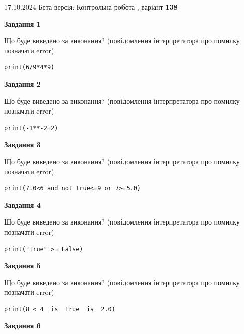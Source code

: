 \documentclass[12pt, ukrainian]{article}
\begin{document}
{\Large{17.10.2024 Бета-версія: Контрольна робота , варіант  \No \textbf { 138 }\par}}
{
\begin {large}
{\begin {center}\textbf{Завдання 1}\end {center}}

Що буде виведено за виконання? (повідомлення інтерпретатора про помилку позначати error)\par
\begin{verbatim}
print(6/9*4*9)
\end{verbatim}

{\begin {center}\textbf{Завдання 2}\end {center}}

Що буде виведено за виконання? (повідомлення інтерпретатора про помилку позначати error)\par
\begin{verbatim}
print(-1**-2+2)
\end{verbatim}

{\begin {center}\textbf{Завдання 3}\end {center}}

Що буде виведено за виконання? (повідомлення інтерпретатора про помилку позначати error)\par
\begin{verbatim}
print(7.0<6 and not True<=9 or 7>=5.0)
\end{verbatim}

{\begin {center}\textbf{Завдання 4}\end {center}}

Що буде виведено за виконання? (повідомлення інтерпретатора про помилку позначати error)\par
\begin{verbatim}
print("True" >= False)
\end{verbatim}

{\begin {center}\textbf{Завдання 5}\end {center}}

Що буде виведено за виконання? (повідомлення інтерпретатора про помилку позначати error)\par
\begin{verbatim}
print(8 < 4  is  True  is  2.0)
\end{verbatim}

{\begin {center}\textbf{Завдання 6}\end {center}}


\end{large}}
\end{document}
